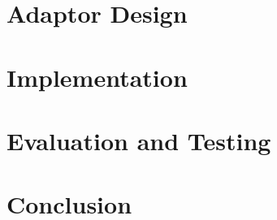 
\chapter{Adaptor Design}



\chapter{Implementation}



\chapter{Evaluation and Testing}



\chapter{Conclusion}


% 